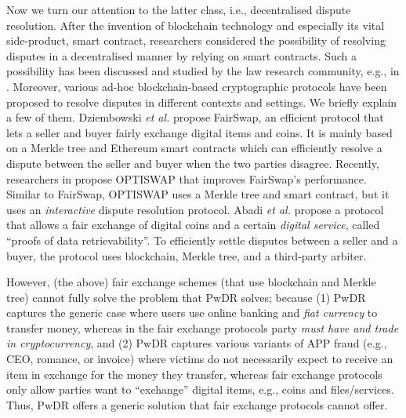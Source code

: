 Now we turn our attention to the latter class, i.e., decentralised dispute resolution. After the invention of blockchain technology and especially its vital side-product, smart contract, researchers considered the possibility of resolving disputes in a decentralised manner by relying on smart contracts. Such a possibility has been discussed and studied by the law research community, e.g., in \cite{buchwald2019smart,ortolani2016self,ortolani2019impact}. Moreover,  various ad-hoc blockchain-based cryptographic protocols have been proposed to resolve disputes in different contexts and settings. We briefly explain a few of them. Dziembowski \textit{et al.}  \cite{DziembowskiEF18} propose FairSwap, an efficient protocol that lets a seller and buyer fairly exchange digital items and coins. It is mainly based on a Merkle tree and Ethereum smart contracts which can efficiently resolve a dispute between the seller and buyer when the two parties disagree. Recently, researchers in  \cite{EckeyFS20} propose OPTISWAP that improves FairSwap’s performance. Similar to FairSwap, OPTISWAP uses a Merkle tree and smart contract, but it uses an \emph{interactive} dispute resolution protocol. Abadi \textit{et al.} \cite{AbadiMZ21a} propose a protocol that allows a  fair exchange of digital coins and a certain \emph{digital service}, called ``proofs of data retrievability''. To efficiently settle disputes between a seller and a buyer, the protocol uses blockchain, Merkle tree, and a third-party arbiter.



However, (the above) fair exchange schemes (that use blockchain and Merkle tree) cannot fully solve the problem that PwDR solves; because (1) PwDR captures the generic case where users use online banking and \emph{fiat currency} to transfer money, whereas in the fair exchange protocols party \emph{must have and trade in cryptocurrency}, and (2) PwDR captures various variants of APP fraud (e.g., CEO, romance, or invoice) where victims do not necessarily expect to receive an item in exchange for the money they transfer, whereas fair exchange protocols only allow parties want to ``exchange'' digital items, e.g., coins and files/services. Thus, PwDR offers a generic solution that fair exchange protocols cannot offer. 


